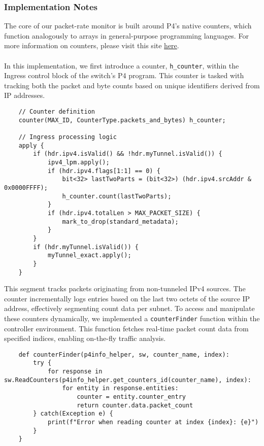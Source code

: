 \subsubsection{Implementation Notes}
The core of our packet-rate monitor is built around P4's native counters, which function analogously to arrays in general-purpose programming languages. For more information on counters, please visit this site \href{https://cornell-pl.github.io/cs6114/lecture07.html}{here}. \\
\\
In this implementation, we first introduce a counter, \verb|h_counter|, within the Ingress control block of the switch's P4 program. This counter is tasked with tracking both the packet and byte counts based on unique identifiers derived from IP addresses.
\begin{lstlisting}
    // Counter definition
    counter(MAX_ID, CounterType.packets_and_bytes) h_counter;
    
    // Ingress processing logic
    apply {
        if (hdr.ipv4.isValid() && !hdr.myTunnel.isValid()) {
            ipv4_lpm.apply();
            if (hdr.ipv4.flags[1:1] == 0) {
                bit<32> lastTwoParts = (bit<32>) (hdr.ipv4.srcAddr & 0x0000FFFF);
                h_counter.count(lastTwoParts);
            }
            if (hdr.ipv4.totalLen > MAX_PACKET_SIZE) {
                mark_to_drop(standard_metadata);
            }
        }
        if (hdr.myTunnel.isValid()) {
            myTunnel_exact.apply();
        }
    }
\end{lstlisting}
This segment tracks packets originating from non-tunneled IPv4 sources. The counter incrementally logs entries based on the last two octets of the source IP address, effectively segmenting count data per subnet. To access and manipulate these counters dynamically, we implemented a \verb|counterFinder| function within the controller environment. This function fetches real-time packet count data from specified indices, enabling on-the-fly traffic analysis.
\begin{lstlisting}
    def counterFinder(p4info_helper, sw, counter_name, index):
        try {
            for response in sw.ReadCounters(p4info_helper.get_counters_id(counter_name), index):
                for entity in response.entities:
                    counter = entity.counter_entry
                    return counter.data.packet_count
        } catch(Exception e) {
            print(f"Error when reading counter at index {index}: {e}")
        }
    }
\end{lstlisting}
